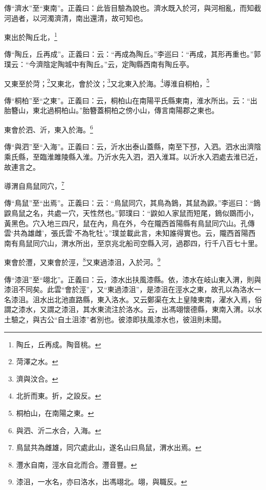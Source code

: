 {\noindent\zhuan{}\fzbyks 傳“濟水”至“東南”。正義曰：此皆目驗為說也。濟水既入於河，與河相亂，而知截河過者，以河濁濟清，南出還清，故可知也。 \par}

東出於陶丘北，\footnote{陶丘，丘再成。陶音桃。}

{\noindent\zhuan{}\fzbyks 傳“陶丘，丘再成”。正義曰：云：“再成為陶丘。”李巡曰：“再成，其形再重也。”郭璞云：“今濟陰定陶城中有陶丘。”云，定陶縣西南有陶丘亭。 \par}

又東至於菏；\footnote{菏澤之水。}又東北，會於汶；\footnote{濟與汶合。}又北東入於海。\footnote{北折而東。折，之設反。}導淮自桐柏，\footnote{桐柏山，在南陽之東。}

{\noindent\zhuan{}\fzbyks 傳“桐柏”至“之東”。正義曰：云，桐柏山在南陽平氏縣東南，淮水所出。云：“出胎簪山，東北過桐柏山。”胎簪蓋桐柏之傍小山，傳言南陽郡之東也。 \par}

東會於泗、沂，東入於海。\footnote{與泗、沂二水合，入海。}

{\noindent\zhuan{}\fzbyks 傳“與泗”至“入海”。正義曰：云，沂水出泰山蓋縣，南至下邳，入泗。泗水出濟陰乘氏縣，至臨淮雎陵縣入淮。乃沂水先入泗，泗入淮耳。以沂水入泗處去淮已近，故連言之。 \par}

導渭自鳥鼠同穴，\footnote{鳥鼠共為雌雄，同穴處此山，遂名山曰鳥鼠，渭水出焉。}

{\noindent\zhuan{}\fzbyks 傳“鳥鼠”至“出焉”。正義曰：云：“鳥鼠同穴，其鳥為鵭，其鼠為鼵。”李巡曰：“鵭鼵鳥鼠之名，共處一穴，天性然也。”郭璞曰：“鼵如人家鼠而短尾，鵭似鵽而小，黃黑色。穴入地三四尺，鼠在內，鳥在外，今在隴西首陽縣有鳥鼠同穴山。孔傳雲‘共為雄雌’，張氏雲‘不為牝牡’。”璞並載此言，未知誰得實也。云，隴西首陽西南有鳥鼠同穴山，渭水所出，至京兆北船司空縣入河，過郡四，行千八百七十里。 \par}

東會於灃，又東會於涇，\footnote{灃水自南，涇水自北而合。灃音豐。}又東過漆沮，入於河。\footnote{漆沮，一水名，亦曰洛水，出馮翊北。翊，與職反。}

{\noindent\zhuan{}\fzbyks 傳“漆沮”至“翊北”。正義曰：云，漆水出扶風漆縣。依，漆水在岐山東入渭，則與漆沮不同矣。此雲“會於涇”，又“東過漆沮”，是漆沮在涇水之東，故孔以為洛水一名漆沮。沮水出北池直路縣，東入洛水。又云鄭渠在太上皇陵東南，濯水入焉，俗謂之漆水，又謂之漆沮，其水東流注於洛水。云，出馮翊懷德縣，東南入渭。以水土驗之，與古公“自土沮漆”者別也。彼漆即扶風漆水也，彼沮則未聞。 \par}

